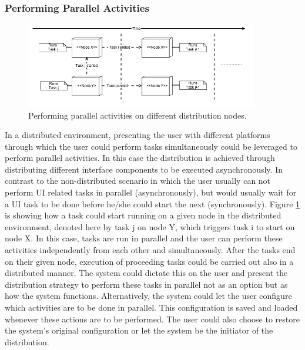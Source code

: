 \subsubsection{Performing Parallel Activities}
\begin{figure}[h]
\includegraphics[width=0.9\textwidth, center, center]{figures/generic2}
\caption{Performing parallel activities on different distribution nodes.}
\label{fig:figure32}
\end{figure}
In a distributed environment, presenting the user with different platforms through which the user could perform tasks simultaneously could be leveraged to perform parallel activities. In this case the distribution is achieved through distributing different interface components to be executed asynchronously. In contrast to the non-distributed scenario in which the user usually can not perform UI related tasks in parallel (asynchronously), but would usually wait for a UI task to be done before he/she could start the next (synchronously). Figure \ref{fig:figure32} is showing how a task could start running on a given node in the distributed environment, denoted here by task j on node Y, which triggers task i to start on node X. In this case, tasks are run in parallel and the user can perform these activities independently from each other and simultaneously. After the tasks end on their given node, execution of proceeding tasks could be carried out also in a distributed manner. 
The system could dictate this on the user and present the distribution strategy to perform these tasks in parallel not as an option but as how the system functions. Alternatively, the system could let the user configure which activities are to be done in parallel. This configuration is saved and loaded whenever these actions are to be performed. The user could also choose to restore the system's original configuration or let the system be the initiator of the distribution.
    
